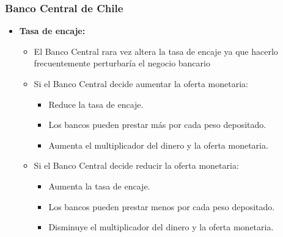 \documentclass[dvipsnames,table,leqno]{beamer}
\begin{document}
		\begin{frame}
			\frametitle{Banco Central de Chile}
			\begin{itemize}
				\item \textbf{Tasa de encaje:} 
					\begin{itemize}
						\item El Banco Central rara vez altera la tasa de encaje ya que hacerlo frecuentemente perturbaría el negocio bancario
						\item Si el Banco Central decide aumentar la oferta monetaria:
							\begin{itemize}
								\item Reduce la tasa de encaje.
								\item Los bancos pueden prestar más por cada peso depositado.
								\item Aumenta el multiplicador del dinero y la oferta monetaria.
							\end{itemize}
						\item Si el Banco Central decide reducir la oferta monetaria:
							\begin{itemize}
								\item Aumenta la tasa de encaje.
								\item Los bancos pueden prestar menos por cada peso depositado.
								\item Disminuye el multiplicador del dinero y la oferta monetaria.
							\end{itemize}
					\end{itemize}
			\end{itemize}
		\end{frame}
\end{document}
